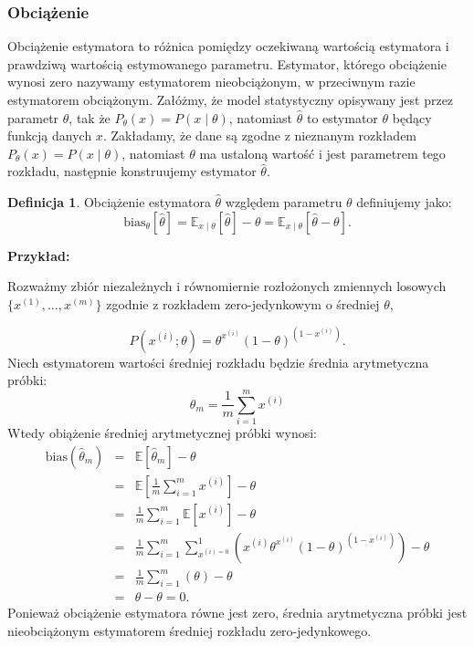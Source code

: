 \documentclass[11pt]{book}
\theoremstyle{definition}
\newtheorem{definition}{Definicja}[section]
\begin{document}
\subsubsection{Obciążenie}
Obciążenie estymatora to różnica pomiędzy oczekiwaną wartością estymatora i prawdziwą wartością estymowanego parametru. Estymator, którego obciążenie wynosi zero nazywamy estymatorem nieobciążonym, w przeciwnym razie estymatorem obciążonym. Załóżmy, że model statystyczny opisywany jest przez parametr $\theta$, tak że $P_{\theta }(x)=P(x\mid \theta)$, natomiast $\hat{\theta}$ to estymator $\theta$ będący funkcją danych $x$. Zakładamy, że dane są zgodne z nieznanym rozkładem $P_{\theta }(x)=P(x\mid \theta)$, natomiast $\theta$ ma ustaloną wartość i jest parametrem tego rozkładu, następnie konstruujemy estymator $\hat{\theta}$.

\begin{definition}
Obciążenie estymatora $\hat{\theta}$ względem parametru $\theta$ definiujemy jako:
	\begin{equation}
	\text{bias}_{\theta}\left[\hat{\theta}\right] = \mathbb{E}_{x \mid \theta }\left[\hat{\theta}\right] - \theta = \mathbb{E}_{x\mid \theta} \left[\hat{\theta}-\theta\right].
	\end{equation}
	
\end{definition}
%
\noindent\textbf{Przykład:} 

\noindent Rozważmy zbiór niezależnych i równomiernie rozłożonych zmiennych losowych $\{{ x^{(1)}, \dots, x^{(m)} }\}$ zgodnie z rozkładem zero-jedynkowym o średniej $\theta$,

\begin{equation}
P(x^{(i)};\theta) = \theta^{x^{(i)}} \left( 1-\theta \right)^{(1-x^{(i)})}.
\end{equation}
%
Niech estymatorem wartości średniej rozkładu będzie średnia arytmetyczna próbki:
\begin{equation}
\theta_m = \frac{1}{m} \sum_{i=1}^m x^{(i)}
\end{equation}
Wtedy obiążenie średniej arytmetycznej próbki wynosi:
\begin{eqnarray}
\text{bias}\left(\hat{\theta}_m\right) &=& \mathbb{E} \left[\hat{\theta}_m \right] - \theta \nonumber \\
&=& \mathbb{E} \left[\frac{1}{m} \sum_{i=1}^m x^{(i)} \right] - \theta\nonumber \\
&=& \frac{1}{m} \sum_{i=1}^{m} \mathbb{E} \left[x^{(i)} \right] - \theta \nonumber \\
&=& \frac{1}{m} \sum_{i=1}^{m} \sum_{x^{(i)=0}}^{1} \left(x^{(i)}\theta^{x^{(i)}} (1-\theta)^{(1-x^{(i)})}\right) - \theta \nonumber \\
&=&  \frac{1}{m} \sum_{i=1}^{m} \left(\theta\right) - \theta \nonumber \\
&=& \theta - \theta = 0.
\end{eqnarray}
%
Ponieważ obciążenie estymatora równe jest zero, średnia arytmetyczna próbki jest nieobciążonym estymatorem średniej rozkładu zero-jedynkowego.
\end{document}
